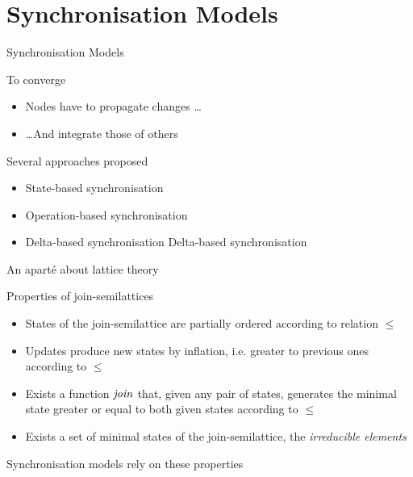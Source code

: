 \section{Synchronisation Models}

\begin{frame}{Synchronisation Models}
    \begin{block}{To converge}
        \begin{itemize}
            \item Nodes have to propagate changes \dots
            \item \dots And integrate those of others
        \end{itemize}
    \end{block}
    \pause
    \begin{block}{Several approaches proposed \cite{shapiro_2011_crdt}}
        \begin{itemize}
            \item State-based synchronisation
            \item Operation-based synchronisation
            \item<3->
                 {Delta-based synchronisation \cite{Almeida_2018}}
                 {\color{gray} Delta-based synchronisation \cite{Almeida_2018}}
        \end{itemize}
    \end{block}
\end{frame}


\begin{frame}{An aparté about lattice theory}

    \begin{block}{Properties of join-semilattices}
        \pause
        \begin{itemize}
            \item States of the join-semilattice are partially ordered according to relation $\leq$
            \pause
            \item Updates produce new states by inflation, i.e. greater to previous ones according to $\leq$
            \pause
            \item Exists a function $\mathit{join}$ that, given any pair of states, generates the minimal state greater or equal to both given states according to $\leq$
            \pause
            \item Exists a set of minimal states of the join-semilattice, the \emph{irreducible elements}
        \end{itemize}
    \end{block}
    \pause
    \center
    \alert{Synchronisation models rely on these properties}
\end{frame}

